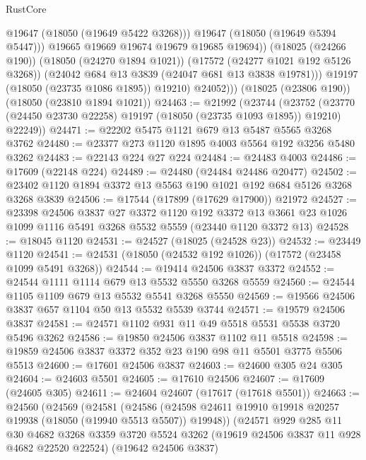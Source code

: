 \begin{lexlean}{RustCore}
\begin{coremodule}
                      @19647
                      (@18050 (@19649 @5422 @3268)))
                    @19647
                    (@18050 (@19649 @5394 @5447)))
                  @19665
                  @19669
                  @19674
                  @19679
                  @19685
                  @19694))
              (@18025 (@24266 @190))
              (@18050 (@24270 @1894 @1021))
              (@17572 (@24277 @1021 @192 @5126 @3268))
              (@24042 @684 @13 @3839 (@24047 @681 @13 @3838 @19781)))
            @19197
            (@18050 (@23735 @1086 @1895))
            @19210)
          @24052)))
    (@18025 (@23806 @190))
    (@18050 (@23810 @1894 @1021))
@24463 := @21992
    (@23744
      (@23752 (@23770 (@24450 @23730 @22258) @19197 (@18050 (@23735 @1093 @1895)) @19210) @22249))
@24471 := @22202 @5475 @1121 @679 @13 @5487 @5565 @3268 @3762
@24480 := @23377 @273 @1120 @1895 @4003 @5564 @192 @3256 @5480 @3262
@24483 := @22143 @224 @27 @224
@24484 := @24483 @4003
@24486 := @17609 (@22148 @224)
@24489 := @24480 (@24484 @24486 @20477)
@24502 := @23402 @1120 @1894 @3372 @13 @5563 @190 @1021 @192 @684 @5126 @3268 @3268 @3839
@24506 := @17544 (@17899 (@17629 @17900)) @21972
@24527 := @23398
    @24506
    @3837
    @27
    @3372
    @1120
    @192
    @3372
    @13
    @3661
    @23
    @1026
    @1099
    @1116
    @5491
    @3268
    @5532
    @5559
    (@23440 @1120 @3372 @13)
@24528 := @18045 @1120
@24531 := @24527 (@18025 (@24528 @23))
@24532 := @23449 @1120
@24541 := @24531 (@18050 (@24532 @192 @1026)) (@17572 (@23458 @1099 @5491 @3268))
@24544 := @19414 @24506 @3837 @3372
@24552 := @24544 @1111 @1114 @679 @13 @5532 @5550 @3268 @5559
@24560 := @24544 @1105 @1109 @679 @13 @5532 @5541 @3268 @5550
@24569 := @19566 @24506 @3837 @657 @1104 @50 @13 @5532 @5539 @3744
@24571 := @19579 @24506 @3837
@24581 := @24571 @1102 @931 @11 @49 @5518 @5531 @5538 @3720 @5496 @3262
@24586 := @19850 @24506 @3837 @1102 @11 @5518
@24598 := @19859 @24506 @3837 @3372 @352 @23 @190 @98 @11 @5501 @3775 @5506 @5513
@24600 := @17601 @24506 @3837
@24603 := @24600 @305 @24 @305
@24604 := @24603 @5501
@24605 := @17610 @24506
@24607 := @17609 (@24605 @305)
@24611 := @24604 @24607 (@17617 (@17618 @5501))
@24663 := @24560
    (@24569
      (@24581
        (@24586 (@24598 @24611 @19910 @19918 @20257 @19938 (@18050 (@19940 @5513 @5507)) @19948))
        (@24571
          @929
          @285
          @11
          @30
          @4682
          @3268
          @3359
          @3720
          @5524
          @3262
          (@19619 @24506 @3837 @11 @928 @4682 @22520 @22524)
          (@19642 @24506 @3837)

\end{coremodule}
\end{lexlean}
